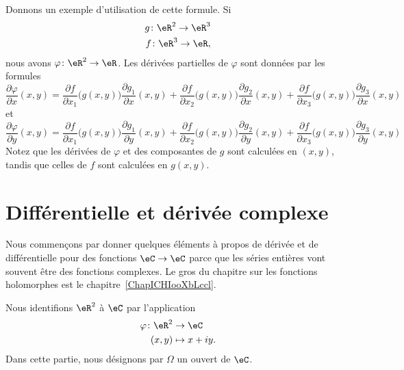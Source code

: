 Donnons un exemple d'utilisation de cette formule. Si
\begin{equation}
	\begin{aligned}[]
		g\colon \eR^2\to \eR^3 \\
		f\colon \eR^3\to \eR,
	\end{aligned}
\end{equation}
nous avons \( \varphi\colon \eR^2\to \eR\). Les dérivées partielles de \( \varphi\) sont données par les formules
\begin{equation}
	\frac{ \partial \varphi }{ \partial x }(x,y)=
	\frac{ \partial f }{ \partial x_1 }\big( g(x,y) \big)\frac{ \partial g_1 }{ \partial x }(x,y)
	+\frac{ \partial f }{ \partial x_2 }\big( g(x,y) \big)\frac{ \partial g_2 }{ \partial x }(x,y)
	+\frac{ \partial f }{ \partial x_3 }\big( g(x,y) \big)\frac{ \partial g_3 }{ \partial x }(x,y)
\end{equation}
et
\begin{equation}
	\frac{ \partial \varphi }{ \partial y }(x,y)=\frac{ \partial f }{ \partial x_1 }\big( g(x,y) \big)\frac{ \partial g_1 }{ \partial y }(x,y)+\frac{ \partial f }{ \partial x_2 }\big( g(x,y) \big)\frac{ \partial g_2 }{ \partial y }(x,y)+\frac{ \partial f }{ \partial x_3 }\big( g(x,y) \big)\frac{ \partial g_3 }{ \partial y }(x,y)
\end{equation}
Notez que les dérivées de \( \varphi\) et des composantes de \( g\) sont calculées en \( (x,y)\), tandis que celles de \( f\) sont calculées en \( g(x,y)\).

\section{Différentielle et dérivée complexe}
\label{SECooJWNOooOgMiWR}

\begin{normaltext}
	Nous commençons par donner quelques éléments à propos de dérivée et de différentielle pour des fonctions \( \eC\to \eC\) parce que les séries entières vont souvent être des fonctions complexes. Le gros du chapitre sur les fonctions holomorphes est le chapitre~\ref{ChapICHIooXbLccl}.
\end{normaltext}

Nous identifions \( \eR^2\) à \( \eC\) par l'application
\begin{equation}
	\begin{aligned}
		\varphi\colon \eR^2 & \to \eC       \\
		(x,y)               & \mapsto x+iy.
	\end{aligned}
\end{equation}
Dans cette partie, nous désignons par \( \Omega\) un ouvert de \( \eC\).

